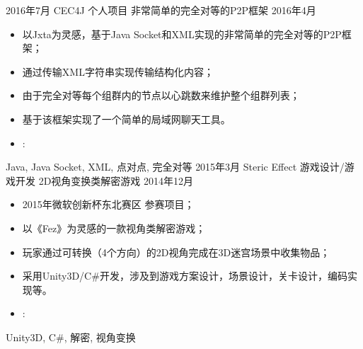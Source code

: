 %
%


\begin{experiences}
 \experience
    {2016年7月}   { CEC4J}{ 个人项目}{ 非常简单的完全对等的P2P框架}
    { 2016年4月} {
                      \begin{itemize}
                        \item 以Jxta为灵感，基于Java Socket和XML实现的非常简单的完全对等的P2P框架；
                        \item 通过传输XML字符串实现传输结构化内容；
                        \item 由于完全对等每个组群内的节点以心跳数来维护整个组群列表；
                        \item 基于该框架实现了一个简单的局域网聊天工具。
                        \item \faGithub: 
                      \end{itemize}
                      \vspace{2pt}
                    }
                    {Java, Java Socket, XML, 点对点, 完全对等}
  \emptySeparator
  \experience
    {2015年3月} { Steric Effect}{ 游戏设计/游戏开发}{ 2D视角变换类解密游戏}
    { 2014年12月}    {
                      \begin{itemize}
                        \item 2015年微软创新杯东北赛区 参赛项目；
                        \item 以《Fez》为灵感的一款视角类解密游戏；
                        \item 玩家通过可转换（4个方向）的2D视角完成在3D迷宫场景中收集物品；
                        \item 采用Unity3D/C\#开发，涉及到游戏方案设计，场景设计，关卡设计，编码实现等。
                        \item \faGithub: 
                      \end{itemize}
                      \vspace{2pt}
                    }
                    {Unity3D, C\#, 解密, 视角变换}
\end{experiences}
